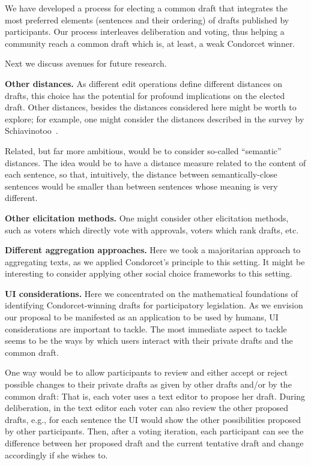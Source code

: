\documentclass[sigconf]{aamas}  %
\newcommand{\mypara}[1]{\smallskip\noindent\textbf{#1.}}
\begin{document}
We have developed a process for electing a common draft that integrates the most preferred elements (sentences and their ordering) of drafts published by participants.
%
Our process interleaves deliberation and voting, thus helping a community reach a common draft which is, at least, a weak Condorcet winner.

Next we discuss avenues for future research. 


\mypara{Other distances}
%
As different edit operations define different distances on drafts, this choice has the potential for profound implications on the elected draft. Other distances, besides the distances considered here might be worth to explore; for example, one might consider the distances described in the survey by Schiavinotoo~\cite{schiavinotto2007review}.

Related, but far more ambitious, would be to consider so-called ``semantic'' distances. The idea would be to have a distance measure related to the content of each sentence, so that, intuitively, the distance between semantically-close sentences would be smaller than between sentences whose meaning is very different.


\mypara{Other elicitation methods}
%
One might consider other elicitation methods, such as voters which directly vote with approvals, voters which rank drafts, etc.


\mypara{Different aggregation approaches}
%
Here we took a majoritarian approach to aggregating texts, as we applied Condorcet's principle to this setting. It might be interesting to consider applying other social choice frameworks to this setting.

\mypara{UI considerations}
%
Here we concentrated on the mathematical foundations of identifying Condorcet-winning drafts for participatory legislation. As we envision our proposal to be manifested as an application to be used by humans, UI considerations are important to tackle. The most immediate aspect to tackle seems to be the ways by which users interact with their private drafts and the common draft.

One way would be to allow participants to review and either accept or reject possible changes to their private drafts as given by other drafts and/or by the common draft:
  That is, each voter uses a text editor to propose her draft. During deliberation, in the text editor each voter can also review the other proposed drafts, e.g., for each sentence the UI would show the other possibilities proposed by other participants. Then, after a voting iteration, each participant can see the difference between her proposed draft and the current tentative draft and change accordingly if she wishes to.
\end{document}
